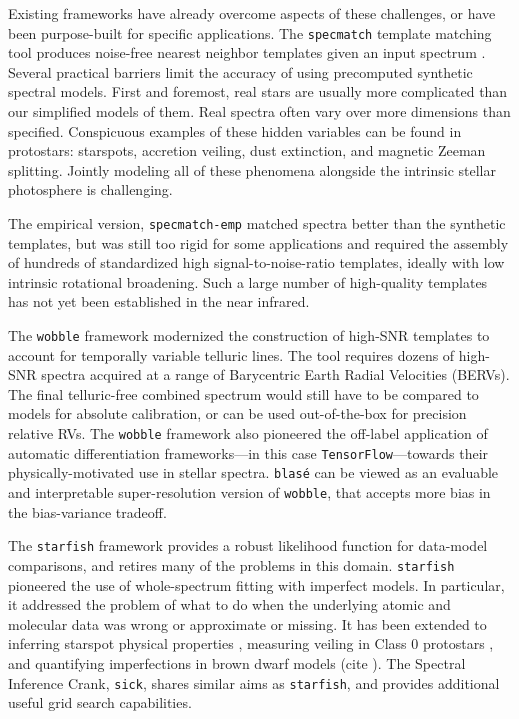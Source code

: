 \documentclass[modern]{aastex631}
\begin{document}
Existing frameworks have already overcome aspects of these challenges, or have been purpose-built for specific applications.  The \texttt{specmatch} template matching tool produces noise-free nearest neighbor templates given an input spectrum \citep{2015PhDT........82P}.  Several practical barriers limit the accuracy of using precomputed synthetic spectral models. First and foremost, real stars are usually more complicated than our simplified models of them. Real spectra often vary over more dimensions than specified. Conspicuous examples of these hidden variables can be found in protostars: starspots, accretion veiling, dust extinction, and magnetic Zeeman splitting. Jointly modeling all of these phenomena alongside the intrinsic stellar photosphere is challenging.

The empirical version, \texttt{specmatch-emp} \citep{2017ApJ...836...77Y} matched spectra better than the synthetic templates, but was still too rigid for some applications and required the assembly of hundreds of standardized high signal-to-noise-ratio templates, ideally with low intrinsic rotational broadening.  Such a large number of high-quality templates has not yet been established in the near infrared.

The \texttt{wobble} framework \citep{2019AJ....158..164B} modernized the construction of high-SNR templates to account for temporally variable telluric lines. The tool requires dozens of high-SNR spectra acquired at a range of Barycentric Earth Radial Velocities (BERVs).  The final telluric-free combined spectrum would still have to be compared to models for absolute calibration, or can be used out-of-the-box for precision relative RVs.  The \texttt{wobble} framework also pioneered the off-label application of automatic differentiation frameworks---in this case \texttt{TensorFlow}---towards their physically-motivated use in stellar spectra.  \texttt{blas\'e} can be viewed as an evaluable and interpretable super-resolution version of \texttt{wobble}, that accepts more bias in the bias-variance tradeoff.

The \texttt{starfish} framework \citep{czekala15} provides a robust likelihood function for data-model comparisons, and retires many of the problems in this domain.  \texttt{starfish} pioneered the use of whole-spectrum fitting with imperfect models.  In particular, it addressed the problem of what to do when the underlying atomic and molecular data was wrong or approximate or missing.  It has been extended to inferring starspot physical properties \citep{2017ApJ...836..200G}, measuring veiling in Class 0 protostars \citep{2018ApJ...862...85G}, and quantifying imperfections in brown dwarf models (cite ).  The Spectral Inference Crank, \texttt{sick}, shares similar aims as \texttt{starfish}, and provides additional useful grid search capabilities.  
\end{document}
